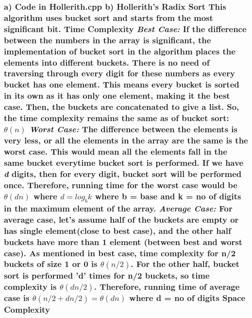 \documentclass[a4paper,12pt]{article}
\begin{document}
\subsubsection*{\textnormal {a) Code in Hollerith.cpp \newline \newline
b) \textbf{Hollerith's Radix Sort}
\newline This algorithm uses bucket sort and starts from the most significant bit.
\newpage
\textbf{Time Complexity} \newline \newline
\textit{Best Case:} \newline
If the difference between the numbers in the array is significant, the implementation of bucket sort in the algorithm places the elements into different buckets. There is no need of traversing through every digit for these numbers as every bucket has one element. This means every bucket is sorted in its own as it has only one element, making it the best case. Then, the buckets are concatenated to give a list. So, the time complexity remains the same as of bucket sort: $\theta(n)$ \newline \newline
\textit{Worst Case:} \newline
The difference between the elements is very less, or all the elements in the array are the same is the worst case. This would mean all the elements fall in the same bucket everytime bucket sort is performed. If we have \textit{d} digits, then for every digit, bucket sort will be performed once. Therefore, running time for the worst case would be $\theta(dn)$ where $ d = log_bk$ where b = base and k = no of digits in the maximum element of the array. \newline
\newline
\textit{Average Case:} \newline
For average case, let's assume half of the buckets are empty or has single element(close to best case), and the other half buckets have more than 1 element (between best and worst case). As mentioned in best case, time complexity for n/2 buckets of size 1 or 0 is $\theta(n/2)$. For the other half, bucket sort is performed 'd' times for n/2 buckets, so time complexity is $\theta(dn/2)$. Therefore, running time of average case is $\theta (n/2 + dn/2) = \theta (dn) $ where d = no of digits
\newline \newline\newline
\textbf{Space Complexity} \newline \newline
}}
\end{document}

